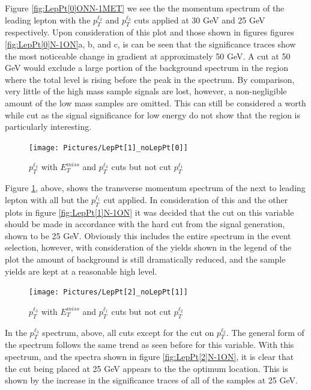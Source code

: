 Figure \ref{fig:LepPt[0]ONN-1MET} we see the the momentum spectrum of the leading lepton with the $p_{T}^{\ell_{2}}$ and $p_{T}^{\ell_{3}}$ cuts applied at 30 GeV and 25 GeV respectively.
Upon consideration of this plot and those shown in figures figures \ref{fig:LepPt[0]N-1ON}a, b, and c, is can be seen that the significance traces show the most noticeable change in gradient at approximately 50 GeV. 
A cut at 50 GeV would exclude a large portion of the background spectrum in the region where the total level is rising before the peak in the spectrum.
By comparison, very little of the high mass sample signals are lost, however, a non-negligible amount of the low mass samples are omitted.   
This can still be considered a worth while cut as the signal significance for low energy do not show that the region is particularly interesting.

\begin{figure}[H] %
   \centering
   \texttt{[image: Pictures/LepPt[1]\_noLepPt[0]]} 
   \caption{$p_{T}^{\ell_{2}}$ with $E_{T}^{miss}$ and $p_{T}^{\ell_{3}}$ cuts but not cut  $p_{T}^{\ell_{1}}$}
   \label{fig:LepPt[1]ONN-1MET}
\end{figure}

\noindent Figure \ref{fig:LepPt[1]ONN-1MET}, above, shows the transverse momentum spectrum of the next to leading lepton with all but the $p_{T}^{\ell_{1}}$ cut applied.
In consideration of this and the other plots in figure \ref{fig:LepPt[1]N-1ON} it was decided that the cut on this variable should be made in accordance with the hard cut from the signal generation, shown to be 25 GeV.
Obviously this includes the entire spectrum in the event selection, however, with consideration of the yields shown in the legend of the plot the amount of background is still dramatically reduced, and the sample yields are kept at a reasonable high level.

\begin{figure}[H] %
   \centering
   \texttt{[image: Pictures/LepPt[2]\_noLepPt[1]]} 
   \caption{$p_{T}^{\ell_{3}}$ with $E_{T}^{miss}$ and $p_{T}^{\ell_{1}}$ cuts but not cut  $p_{T}^{\ell_{2}}$}
   \label{fig:LepPt[2]ONN-1LepPt[1]}
\end{figure}

\noindent In the $p_{T}^{\ell_{3}}$ spectrum, above, all cuts except for the cut on $p_{T}^{\ell_{2}}$.
The general form of the spectrum follows the same trend as seen before for this variable. 
With this spectrum, and the spectra shown in figure \ref{fig:LepPt[2]N-1ON}, it is clear that the cut being placed at 25 GeV appears to the the optimum location.
This is shown by the increase in the significance traces of all of the samples at 25 GeV.


